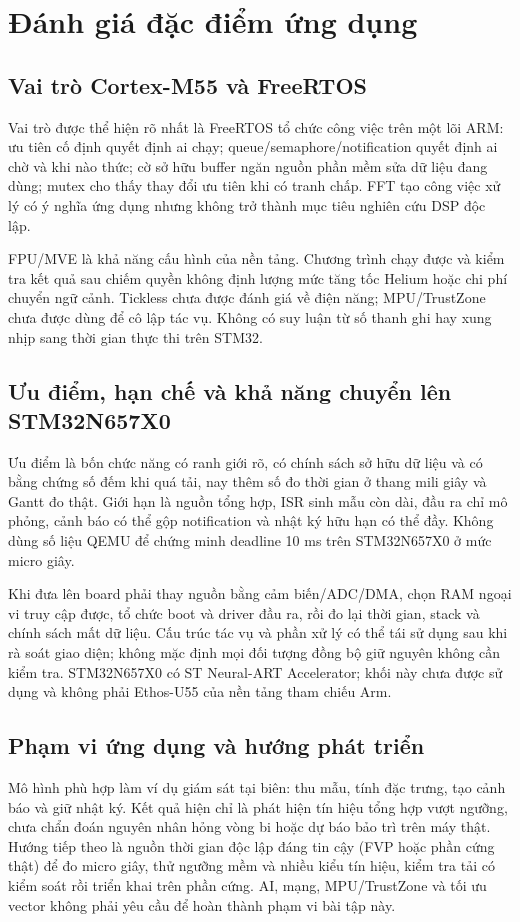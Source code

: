 \documentclass[12pt,a4paper,oneside]{report}
\begin{document}
\section{Đánh giá đặc điểm ứng dụng}
\subsection{Vai trò Cortex-M55 và FreeRTOS}
Vai trò được thể hiện rõ nhất là FreeRTOS tổ chức công việc trên một lõi ARM: ưu tiên cố định quyết định ai chạy; queue/semaphore/notification quyết định ai chờ và khi nào thức; cờ sở hữu buffer ngăn nguồn phần mềm sửa dữ liệu đang dùng; mutex cho thấy thay đổi ưu tiên khi có tranh chấp. FFT tạo công việc xử lý có ý nghĩa ứng dụng nhưng không trở thành mục tiêu nghiên cứu DSP độc lập.

FPU/MVE là khả năng cấu hình của nền tảng. Chương trình chạy được và kiểm tra kết quả sau chiếm quyền không định lượng mức tăng tốc Helium hoặc chi phí chuyển ngữ cảnh. Tickless chưa được đánh giá về điện năng; MPU/TrustZone chưa được dùng để cô lập tác vụ. Không có suy luận từ số thanh ghi hay xung nhịp sang thời gian thực thi trên STM32.

\subsection{Ưu điểm, hạn chế và khả năng chuyển lên STM32N657X0}
Ưu điểm là bốn chức năng có ranh giới rõ, có chính sách sở hữu dữ liệu và có bằng chứng số đếm khi quá tải, nay thêm số đo thời gian ở thang mili giây và Gantt đo thật. Giới hạn là nguồn tổng hợp, ISR sinh mẫu còn dài, đầu ra chỉ mô phỏng, cảnh báo có thể gộp notification và nhật ký hữu hạn có thể đầy. Không dùng số liệu QEMU để chứng minh deadline 10 ms trên STM32N657X0 ở mức micro giây.

Khi đưa lên board phải thay nguồn bằng cảm biến/ADC/DMA, chọn RAM ngoại vi truy cập được, tổ chức boot và driver đầu ra, rồi đo lại thời gian, stack và chính sách mất dữ liệu. Cấu trúc tác vụ và phần xử lý có thể tái sử dụng sau khi rà soát giao diện; không mặc định mọi đối tượng đồng bộ giữ nguyên không cần kiểm tra. STM32N657X0 có ST Neural-ART Accelerator; khối này chưa được sử dụng và không phải Ethos-U55 của nền tảng tham chiếu Arm.

\subsection{Phạm vi ứng dụng và hướng phát triển}
Mô hình phù hợp làm ví dụ giám sát tại biên: thu mẫu, tính đặc trưng, tạo cảnh báo và giữ nhật ký. Kết quả hiện chỉ là phát hiện tín hiệu tổng hợp vượt ngưỡng, chưa chẩn đoán nguyên nhân hỏng vòng bi hoặc dự báo bảo trì trên máy thật. Hướng tiếp theo là nguồn thời gian độc lập đáng tin cậy (FVP hoặc phần cứng thật) để đo micro giây, thử ngưỡng mềm và nhiều kiểu tín hiệu, kiểm tra tải có kiểm soát rồi triển khai trên phần cứng. AI, mạng, MPU/TrustZone và tối ưu vector không phải yêu cầu để hoàn thành phạm vi bài tập này.
\end{document}
